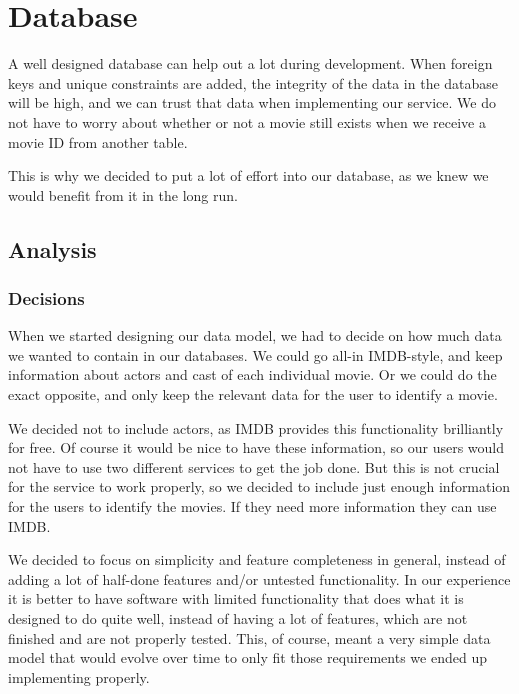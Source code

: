 \section{Database}
\label{Design_Database}
A well designed database can help out a lot during development. When foreign keys and unique constraints are added, the integrity of the data in the database will be high, and we can trust that data when implementing our service. We do not have to worry about whether or not a movie still exists when we receive a movie ID from another table.

This is why we decided to put a lot of effort into our database, as we knew we would benefit from it in the long run.

\subsection{Analysis}
\label{Design_Database_Analysis}

\subsubsection{Decisions}
\label{Design_Database_Analysis_Decisions}

When we started designing our data model, we had to decide on how much data we wanted to contain in our databases. We could go all-in IMDB-style, and keep information about actors and cast of each individual movie. Or we could do the exact opposite, and only keep the relevant data for the user to identify a movie.

We decided not to include actors, as IMDB provides this functionality brilliantly for free. Of course it would be nice to have these information, so our users would not have to use two different services to get the job done. But this is not crucial for the service to work properly, so we decided to include just enough information for the users to identify the movies. If they need more information they can use IMDB.

We decided to focus on simplicity and feature completeness in general, instead of adding a lot of half-done features and/or untested functionality. In our experience it is better to have software with limited functionality that does what it is designed to do quite well, instead of having a lot of features, which are not finished and are not properly tested. This, of course, meant a very simple data model that would evolve over time to only fit those requirements we ended up implementing properly.

